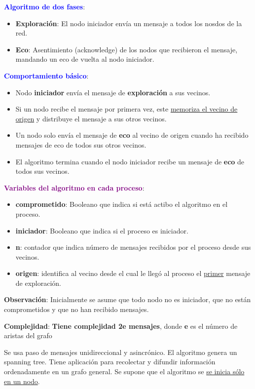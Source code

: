 \textbf{\textcolor{blue}{Algoritmo de dos fases}}: \begin{itemize}
    \item \textbf{Exploración}: El nodo iniciador envía un mensaje a todos los nosdos de la red.
    \item \textbf{Eco}: Asentimiento (acknowledge) de los nodos que recibieron el mensaje, mandando un eco de vuelta al nodo iniciador.
\end{itemize}

\textbf{\textcolor{blue}{Comportamiento básico}}: \begin{itemize}
    \item Nodo \textbf{iniciador} envía el mensaje de \textbf{exploración} a sus vecinos.
    \item Si un nodo recibe el mensaje por primera vez, este \underline{memoriza el vecino de origen} y distribuye el mensaje a sus otros vecinos.
    \item Un nodo solo envía el mensaje de \textbf{eco} al vecino de origen cuando ha recibido mensajes de eco de todos sus otros vecinos.
    \item El algoritmo termina cuando el nodo iniciador recibe un mensaje de \textbf{eco} de todos sus vecinos.
\end{itemize}

\textbf{{\textcolor{purple}{Variables del algoritmo en cada proceso}}}: \begin{itemize}
    \item \textbf{comprometido}: Booleano que indica si está actibo el algoritmo en el proceso.
    \item \textbf{iniciador}: Booleano que indica si el proceso es iniciador.
    \item \textbf{n}: contador que indica número de mensajes recibidos por el proceso desde sus vecinos.
    \item \textbf{origen}: identifica al vecino desde el cual le llegó al proceso el \underline{primer} mensaje de exploración.
\end{itemize}

\textbf{Observación}: Inicialmente se asume que todo nodo no es iniciador, que no están comprometidos y que no han recibido mensajes.

\vspace{0.5em}

\textbf{Complejidad}: \textbf{Tiene complejidad 2e mensajes}, donde \textbf{e} es el número de aristas del grafo

Se usa paso de mensajes unidireccional y asincrónico. El algoritmo genera un spanning tree. Tiene aplicación para recolectar y difundir información ordenadamente en un grafo general. Se supone que el algoritmo se \underline{se inicia sólo en un nodo}.

